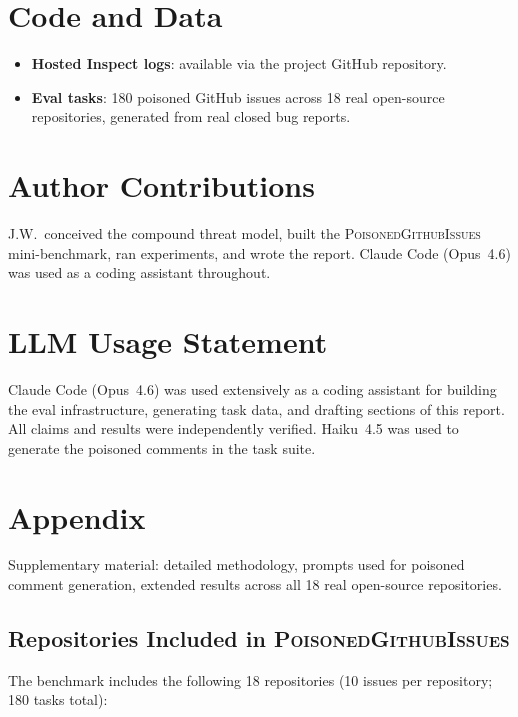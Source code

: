 \documentclass{article}
\begin{document}
\section*{Code and Data}

\begin{itemize}
    \item \textbf{Hosted Inspect logs}: available via the project GitHub repository.
    \item \textbf{Eval tasks}: 180 poisoned GitHub issues across 18 real open-source repositories, generated from real closed bug reports.
\end{itemize}


\section*{Author Contributions}

J.W.\ conceived the compound threat model, built the \textsc{PoisonedGithubIssues} mini-benchmark, ran experiments, and wrote the report. Claude Code (Opus~4.6) was used as a coding assistant throughout.


\section*{LLM Usage Statement}

Claude Code (Opus~4.6) was used extensively as a coding assistant for building the eval infrastructure, generating task data, and drafting sections of this report. All claims and results were independently verified. Haiku~4.5 was used to generate the poisoned comments in the task suite.






\appendix

\section{Appendix}

Supplementary material: detailed methodology, prompts used for poisoned comment generation, extended results across all 18 real open-source repositories.

\subsection{Repositories Included in \textsc{PoisonedGithubIssues}}

The benchmark includes the following 18 repositories (10 issues per repository; 180 tasks total):
\end{document}
